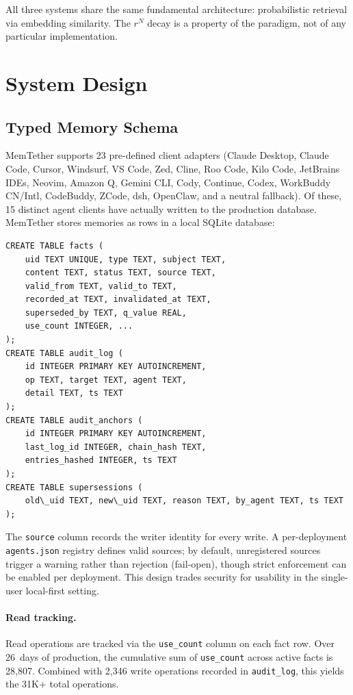 \documentclass{article}
\begin{document}
All three systems share the same fundamental architecture: probabilistic retrieval via embedding similarity. The $r^N$ decay is a property of the paradigm, not of any particular implementation.




\section{System Design}
\label{sec:design}

\subsection{Typed Memory Schema}
MemTether supports 23 pre-defined client adapters (Claude Desktop, Claude Code, Cursor, Windsurf, VS Code, Zed, Cline, Roo Code, Kilo Code, JetBrains IDEs, Neovim, Amazon Q, Gemini CLI, Cody, Continue, Codex, WorkBuddy CN/Intl, CodeBuddy, ZCode, dsh, OpenClaw, and a neutral fallback). Of these, 15 distinct agent clients have actually written to the production database. MemTether stores memories as rows in a local SQLite database:

\begin{verbatim}
CREATE TABLE facts (
    uid TEXT UNIQUE, type TEXT, subject TEXT,
    content TEXT, status TEXT, source TEXT,
    valid_from TEXT, valid_to TEXT,
    recorded_at TEXT, invalidated_at TEXT,
    superseded_by TEXT, q_value REAL,
    use_count INTEGER, ...
);
CREATE TABLE audit_log (
    id INTEGER PRIMARY KEY AUTOINCREMENT,
    op TEXT, target TEXT, agent TEXT,
    detail TEXT, ts TEXT
);
CREATE TABLE audit_anchors (
    id INTEGER PRIMARY KEY AUTOINCREMENT,
    last_log_id INTEGER, chain_hash TEXT,
    entries_hashed INTEGER, ts TEXT
);
CREATE TABLE supersessions (
    old\_uid TEXT, new\_uid TEXT, reason TEXT, by_agent TEXT, ts TEXT
);
\end{verbatim}

The \texttt{source} column records the writer identity for every write. A per-deployment \texttt{agents.json} registry defines valid sources; by default, unregistered sources trigger a warning rather than rejection (fail-open), though strict enforcement can be enabled per deployment. This design trades security for usability in the single-user local-first setting.

\paragraph{Read tracking.}
Read operations are tracked via the \texttt{use\_count} column on each fact row. Over 26~days of production, the cumulative sum of \texttt{use\_count} across active facts is 28{,}807. Combined with 2{,}346 write operations recorded in \texttt{audit\_log}, this yields the 31K+ total operations.
\end{document}

